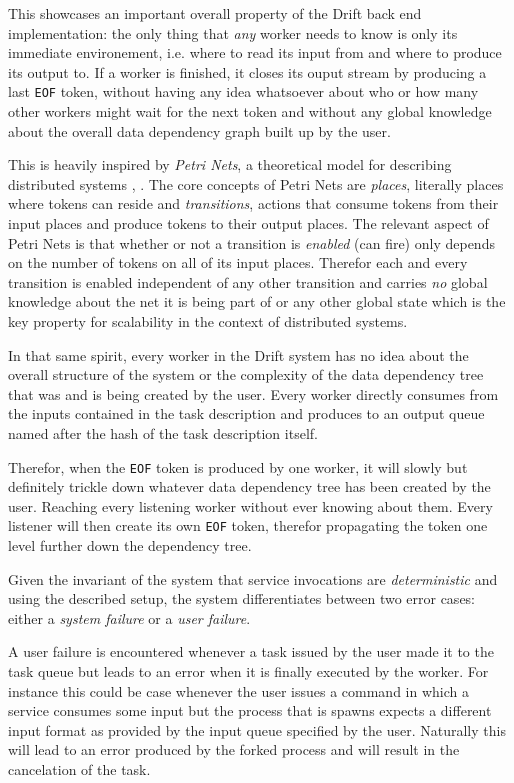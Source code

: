 This showcases an important overall property of the Drift back end
implementation: the only thing that \textit{any} worker needs
to know is only its immediate environement, i.e. where to read its
input from and where to produce its output to. If a worker
is finished, it closes its ouput stream by producing a last
\texttt{EOF} token, without having any idea whatsoever about
who or how many other workers might wait for the next token
and without any global knowledge about the overall
data dependency graph built up by the user.

This is heavily inspired by \textit{Petri Nets}, a theoretical
model for describing distributed systems \cite{pnbook}, \cite{pnwiki}.
The core concepts of Petri Nets are \textit{places}, literally
places where tokens can reside and \textit{transitions}, actions
that consume tokens from their input places and produce tokens
to their output places. The relevant aspect of Petri Nets is that
whether or not a transition is \textit{enabled} (can fire) only
depends on the number of tokens on all of its input places.
Therefor each and every transition is enabled independent of
any other transition and carries \textit{no} global knowledge about
the net it is being part of or any other global state which is
the key property for scalability in the context of distributed
systems.

In that same spirit, every worker in the Drift system has no
idea about the overall structure of the system or the complexity
of the data dependency tree that was and is being created by the
user. Every worker directly consumes from the inputs contained
in the task description and produces to an output queue named after
the hash of the task description itself.

Therefor, when the \texttt{EOF} token is produced by one worker, it will
slowly but definitely trickle down whatever data dependency tree
has been created by the user. Reaching every listening worker
without ever knowing about them. Every listener will then create
its own \texttt{EOF} token, therefor propagating the token one
level further down the dependency tree.
\newline

Given the invariant of the system that service invocations are
\textit{deterministic} and using the described setup, the system
differentiates between two error cases: either a \textit{system failure}
or a \textit{user failure}.

A user failure is encountered whenever a task issued by the user
made it to the task queue but leads to an error when it is finally
executed by the worker. For instance this could be case whenever
the user issues a command in which a service consumes some input
but the process that is spawns expects a different input format
as provided by the input queue specified by the user. Naturally
this will lead to an error produced by the forked process and
will result in the cancelation of the task.

